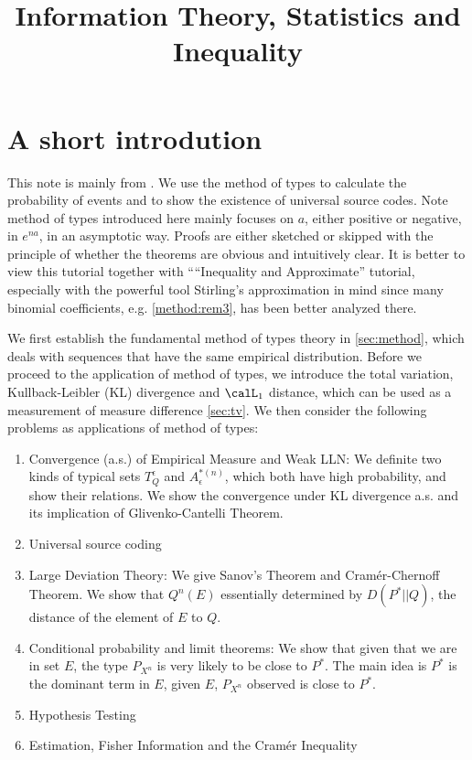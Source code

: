 \documentclass{article}
\title{Information Theory, Statistics and Inequality}
\begin{document}
\maketitle

\section{A short introdution}
This note is mainly from \cite{cover1999elements}. We use the method of types to calculate the probability of  events and to show the existence of universal source codes.  Note method of types introduced here mainly focuses on  $a$, either positive or negative, in $e^{na}$,  in an asymptotic way. Proofs are either sketched or skipped with the principle of whether the theorems are obvious and intuitively clear. It is better to view this tutorial together with ``“Inequality and Approximate'' tutorial, especially with the powerful tool Stirling’s approximation in mind since many binomial coefficients, e.g. \cref{method:rem3}, has been better analyzed there.

We first establish the fundamental method of types theory in \cref{sec:method}, which deals with sequences that have the same empirical distribution. Before we proceed to the application of method of types, we introduce the total variation, Kullback-Leibler (KL) divergence  and $\calL_1$ distance, which can be used as a measurement of measure difference \cref{sec:tv}. We then consider the following problems as applications of method of types:
\begin{enumerate}
\item Convergence (a.s.) of Empirical Measure and Weak LLN: We definite two kinds of typical sets $T_{Q}^{\epsilon}$ and $A_{\epsilon}^{*(n)}$, which both have high probability, and show their relations. We show the convergence under KL divergence a.s. and its implication of Glivenko-Cantelli Theorem.  
\item Universal source coding 
\item  Large Deviation Theory: We give Sanov's Theorem and  Cram\'{e}r-Chernoff Theorem. We show that $Q^n(E)$ essentially determined by $D\left(P^{*}|| Q\right)$, the distance of the  element of $E$ to $Q$. 
\item Conditional probability and limit theorems: We show that given that we are in set $E$, the type $P_{X^n}$ is very likely to be close to $P^{*}$. The main idea is $P^*$ is the dominant term in $E$, given $E$, $P_{X^n}$ observed is close to $P^*$. 
\item Hypothesis Testing
\item Estimation, Fisher Information and the Cram\'{e}r Inequality
\end{enumerate}
\end{document}
